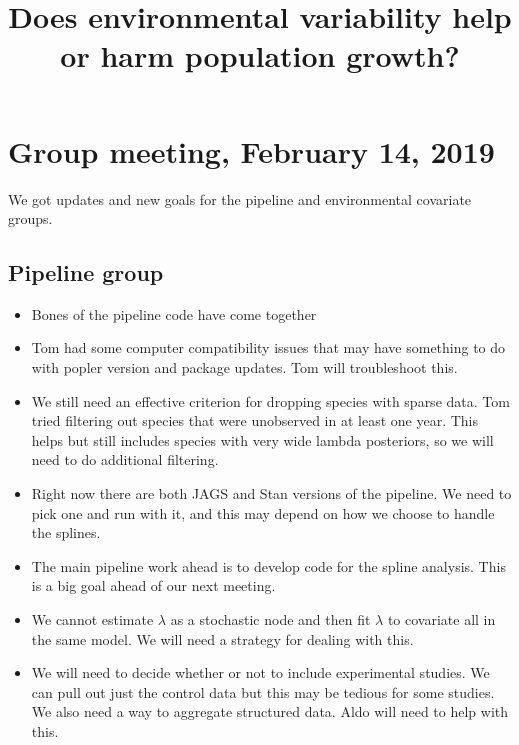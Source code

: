 \documentclass{article}
\title{Does environmental variability help or harm population growth?}
\begin{document}
  \maketitle

\section{Group meeting, February 14, 2019}
We got updates and new goals for the pipeline and environmental covariate groups.
\subsection{Pipeline group}
\begin{itemize}
\item{Bones of the pipeline code have come together}
\item{Tom had some computer compatibility issues that may have something to do with popler version and package updates. Tom will troubleshoot this.}
\item{We still need an effective criterion for dropping species with sparse data. Tom tried filtering out species that were unobserved in at least one year. This helps but still includes species with very wide lambda posteriors, so we will need to do additional filtering.}
\item{Right now there are both JAGS and Stan versions of the pipeline. We need to pick one and run with it, and this may depend on how we choose to handle the splines.}
\item{The main pipeline work ahead is to develop code for the spline analysis. This is a big goal ahead of our next meeting.}
\item{We cannot estimate $\lambda$ as a stochastic node and then fit $\lambda$ to covariate all in the same model. We will need a strategy for dealing with this.}
\item{We will need to decide whether or not to include experimental studies. We can pull out just the control data but this may be tedious for some studies. We also need a way to aggregate structured data. Aldo will need to help with this.}
\end{itemize}
\end{document}
